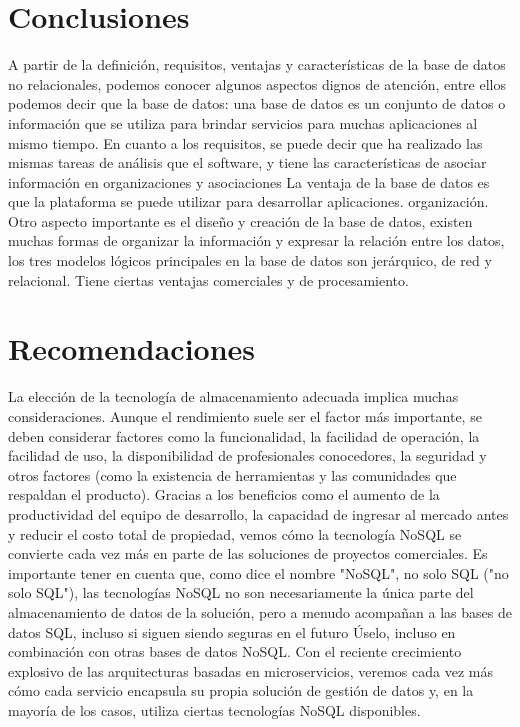 \documentclass[twocolumn]{article}
\begin{document}
\newpage
\section{Conclusiones}
A partir de la definición, requisitos, ventajas 
y características de la base de datos no relacionales, podemos 
conocer algunos aspectos dignos de atención, entre ellos
 podemos decir que la base de datos: una base de datos es 
 un conjunto de datos o información que se utiliza para brindar servicios para muchas aplicaciones al mismo tiempo. En cuanto a los requisitos, se puede decir que ha realizado las mismas tareas de análisis que el software, y tiene las características de asociar información en organizaciones y asociaciones La ventaja de la base de datos es que la plataforma se puede utilizar para desarrollar aplicaciones. organización. Otro aspecto importante es el diseño y creación de la base de datos, existen muchas formas de organizar la información y expresar la relación entre los datos, los tres modelos lógicos principales en la base de datos son jerárquico, de red y relacional. Tiene ciertas ventajas comerciales y de procesamiento.


\section{Recomendaciones}

La elección de la tecnología de almacenamiento
 adecuada implica muchas consideraciones. Aunque 
 el rendimiento suele ser el factor más importante,
  se deben considerar factores como la funcionalidad, 
  la facilidad de operación, la facilidad de uso, la 
  disponibilidad de profesionales conocedores, la seguridad 
  y otros factores (como la existencia de herramientas y las 
  comunidades que respaldan el producto).
   Gracias a los beneficios como el aumento de 
   la productividad del equipo de desarrollo, la capacidad 
   de ingresar al mercado antes y reducir el costo total de
    propiedad, vemos cómo la tecnología NoSQL se convierte 
    cada vez más en parte de las soluciones de proyectos 
    comerciales.
    Es importante tener en cuenta que, como dice el nombre "NoSQL", no solo SQL
     ("no solo SQL"), las tecnologías NoSQL no son necesariamente la única parte 
     del almacenamiento de datos de la solución, pero a menudo acompañan a las bases
      de datos SQL, incluso si siguen siendo seguras en el futuro Úselo, incluso en 
      combinación con otras bases de datos NoSQL.
      Con el reciente crecimiento explosivo de las arquitecturas
       basadas en microservicios, veremos cada vez más cómo cada 
       servicio encapsula su propia solución de gestión de datos y, 
       en la mayoría de los casos, utiliza ciertas tecnologías NoSQL disponibles.
\end{document}
